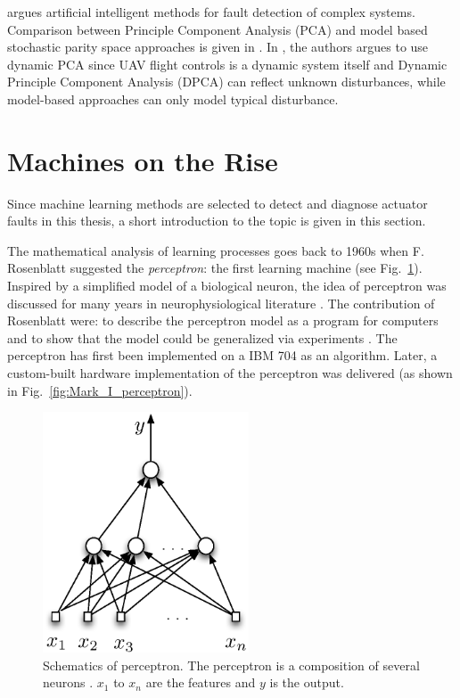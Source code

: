 \cite{gui2002fault} argues artificial intelligent methods for fault detection of complex 
systems. Comparison between Principle Component Analysis (PCA) and model based stochastic parity space 
approaches is given in \cite{hagenblad2004comparison}.
In \cite{li2016data}, the authors argues to use dynamic PCA since UAV flight 
controls is a dynamic system itself and Dynamic Principle Component Analysis (DPCA) can reflect unknown disturbances, 
while model-based approaches can only model typical disturbance.  

\section{Machines on the Rise}

Since machine learning methods are selected to detect and diagnose actuator faults in this thesis, a short introduction to the topic is given in this section. 

The mathematical analysis of learning processes goes back to 1960s when F. Rosenblatt \cite{rosenblatt1958perceptron} suggested the \emph{perceptron}: the first learning machine \cite{vapnik2013nature} (see Fig.~\ref{fig:perceptron}). 
Inspired by a simplified model of a biological neuron, the idea of perceptron was discussed for many years in neurophysiological literature \cite{vapnik2013nature}. The contribution of Rosenblatt were: to describe the perceptron model as a program for computers and to show that the model could be generalized via experiments \cite{vapnik2013nature}.
The perceptron has first been implemented on a IBM 704 as an algorithm. 
Later, a custom-built hardware implementation of the perceptron was delivered (as shown in Fig.~\ref{fig:Mark_I_perceptron}).

\begin{figure}
\begin{center}
\includegraphics[width=6.1cm]{figures/perceptron}
\caption{Schematics of perceptron. The perceptron is a composition of several neurons \cite{vapnik2013nature}. $x_1$ to $x_n$ are the features and $y$ is the output.} 
\label{fig:perceptron}
\end{center}
\end{figure}

